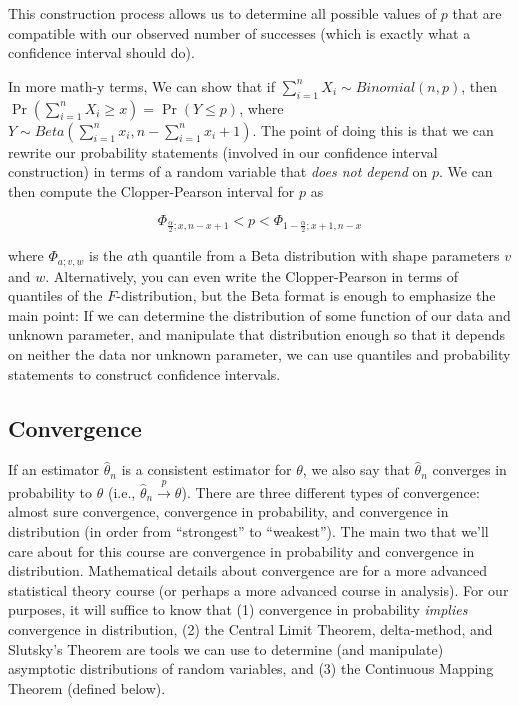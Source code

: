 \documentclass[
  letterpaper,
  DIV=11,
  numbers=noendperiod]{scrreprt}
\begin{document}
This construction process allows us to determine all possible values of
\(p\) that are compatible with our observed number of successes (which
is exactly what a confidence interval should do).

In more math-y terms, We can show that if
\(\sum_{i = 1}^n X_i \sim Binomial(n, p)\), then
\(\Pr(\sum_{i = 1}^n X_i \geq x) = \Pr(Y \leq p)\), where
\(Y \sim Beta(\sum_{i = 1}^n x_i, n - \sum_{i = 1}^n x_i + 1)\). The
point of doing this is that we can rewrite our probability statements
(involved in our confidence interval construction) in terms of a random
variable that \emph{does not depend} on \(p\). We can then compute the
Clopper-Pearson interval for \(p\) as

\[
\Phi_{\frac{\alpha}{2}; x, n - x + 1} < p < \Phi_{1 - \frac{\alpha}{2}; x + 1, n - x}
\]

where \(\Phi_{a; v, w}\) is the \(a\)th quantile from a Beta
distribution with shape parameters \(v\) and \(w\). Alternatively, you
can even write the Clopper-Pearson in terms of quantiles of the
\(F\)-distribution, but the Beta format is enough to emphasize the main
point: If we can determine the distribution of some function of our data
and unknown parameter, and manipulate that distribution enough so that
it depends on neither the data nor unknown parameter, we can use
quantiles and probability statements to construct confidence intervals.

\subsection*{Convergence}\label{convergence}

If an estimator \(\hat{\theta}_n\) is a consistent estimator for
\(\theta\), we also say that \(\hat{\theta}_n\) converges in probability
to \(\theta\) (i.e., \(\hat{\theta}_n \overset{p}{\to} \theta\)). There
are three different types of convergence: almost sure convergence,
convergence in probability, and convergence in distribution (in order
from ``strongest'' to ``weakest''). The main two that we'll care about
for this course are convergence in probability and convergence in
distribution. Mathematical details about convergence are for a more
advanced statistical theory course (or perhaps a more advanced course in
analysis). For our purposes, it will suffice to know that (1)
convergence in probability \emph{implies} convergence in distribution,
(2) the Central Limit Theorem, delta-method, and Slutsky's Theorem are
tools we can use to determine (and manipulate) asymptotic distributions
of random variables, and (3) the Continuous Mapping Theorem (defined
below).
\end{document}
